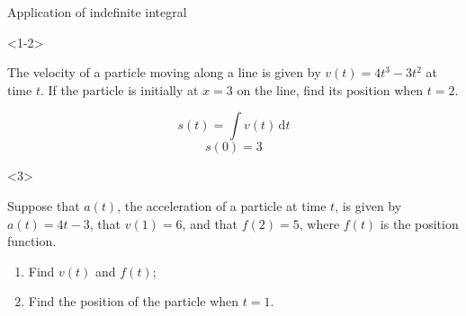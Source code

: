 \begin{frame}{Application of indefinite integral}

\begin{onlyenv}<1-2>

\begin{example}
The velocity of a particle moving along a line is given by $v\left(t\right)=4t^{3}-3t^{2}$
at time $t$. If the particle is initially at $x=3$ on the line,
find its position when $t=2$.
\end{example}


\pause{}
\begin{sol}
\[
s\left(t\right)=\int v\left(t\right)\,\mathrm{d}t
\]
\[
s\left(0\right)=3
\]

\end{sol}
\end{onlyenv}



\begin{onlyenv}<3>

\begin{example}
Suppose that $a\left(t\right)$, the acceleration of a particle at
time $t$, is given by $a\left(t\right)=4t-3$, that $v\left(1\right)=6$,
and that $f\left(2\right)=5$, where $f\left(t\right)$ is the position
function.
\begin{enumerate}
\item Find $v\left(t\right)$ and $f\left(t\right)$;
\item Find the position of the particle when $t=1$.
\end{enumerate}

\end{example}

\end{onlyenv}

\end{frame}



